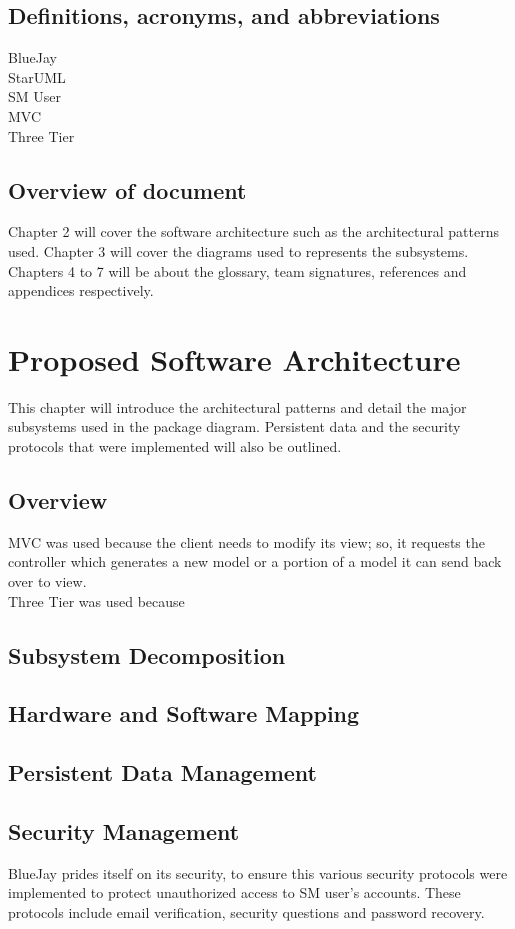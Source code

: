 \documentclass{report}
\begin{document}
\section{Definitions, acronyms, and abbreviations}
BlueJay\\StarUML\\SM User\\MVC\\Three Tier
\section{Overview of document}
		Chapter 2 will cover the software architecture such as the architectural patterns used. Chapter 3 will cover the diagrams used to represents the subsystems. Chapters 4 to 7 will be about the glossary, team signatures, references and appendices respectively.
\chapter{Proposed Software Architecture}
	This chapter will introduce the architectural patterns and detail the major subsystems used in the package diagram. Persistent data and the security protocols that were implemented will also be outlined.
\section{Overview}
	MVC was used because the client needs to modify its view; so, it requests the controller which generates a new model or a portion of a model it can send back over to view.\\
	Three Tier was used because
\section{Subsystem Decomposition}
\section{Hardware and Software Mapping}
\section{Persistent Data Management}
\section{Security Management}
	BlueJay prides itself on its security, to ensure this various security protocols were implemented to protect unauthorized access to SM user’s accounts. These protocols include email verification, security questions and password recovery. 
\end{document}
